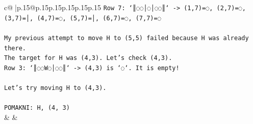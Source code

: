 \documentclass{article}
\begin{document}
{\begin{supertabular}{c@{$\;$}|p{.15\linewidth}@{}p{.15\linewidth}p{.15\linewidth}p{.15\linewidth}p{.15\linewidth}p{.15\linewidth}}
{{{\texttt{Row 7: `║◌◌│◌│◌◌║` {-}> (1,7)=◌, (2,7)=◌, (3,7)=│, (4,7)=◌, (5,7)=│, (6,7)=◌, (7,7)=◌} \\
\\ 
\texttt{My previous attempt to move H to (5,5) failed because H was already there.} \\
\texttt{The target for H was (4,3). Let's check (4,3).} \\
\texttt{Row 3: `║◌◌W◌│◌◌║` {-}> (4,3) is `◌`. It is empty!} \\
\\ 
\texttt{Let's try moving H to (4,3).} \\
\\ 
\texttt{POMAKNI: H, (4, 3)} \\
            }
        }
    }
    & & \\ \\


\end{supertabular}}
\end{document}
